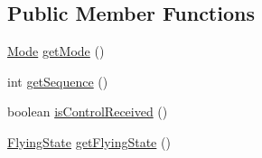 \subsection*{Public Member Functions}
\begin{DoxyCompactItemize}
\item 
\hyperlink{enumworkspace_1_1_a_r_drone_nav_data_1_1src_1_1controller_1_1_mode}{Mode} \hyperlink{classworkspace_1_1_a_r_drone_nav_data_1_1src_1_1_nav_data_a2464dd262d11a9bef67c17f0d62e63ec}{get\+Mode} ()
\item 
int \hyperlink{classworkspace_1_1_a_r_drone_nav_data_1_1src_1_1_nav_data_a7ea044e9406f7be1388b9317856e6467}{get\+Sequence} ()
\item 
boolean \hyperlink{classworkspace_1_1_a_r_drone_nav_data_1_1src_1_1_nav_data_a8253cc4c0fbbd3113e8f8f898d084a61}{is\+Control\+Received} ()
\item 
\hyperlink{enumworkspace_1_1_a_r_drone_nav_data_1_1src_1_1controller_1_1_flying_state}{Flying\+State} \hyperlink{classworkspace_1_1_a_r_drone_nav_data_1_1src_1_1_nav_data_a6a58bfbbffd4516478ded2e652f853a6}{get\+Flying\+State} ()
\end{DoxyCompactItemize}
